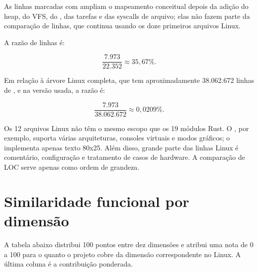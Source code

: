 As linhas marcadas com \code{---} ampliam o mapeamento conceitual depois da
adi\c{c}\~ao do heap, do VFS, do , das tarefas e das syscalls de
arquivo; elas n\~ao fazem parte da compara\c{c}\~ao de linhas, que continua
usando os doze primeiros arquivos Linux.

A raz\~ao de linhas \'e:

\[
\frac{7.973}{22.352} \approx 35{,}67\%.
\]

Em rela\c{c}\~ao \`a \'arvore Linux completa, que tem aproximadamente
38.062.672 linhas de ,  e  na vers\~ao usada, a
raz\~ao \'e:

\[
\frac{7.973}{38.062.672} \approx 0{,}0209\%.
\]

\begin{atencao}
Os 12 arquivos Linux n\~ao t\^em o mesmo escopo que os 19 m\'odulos Rust. O
, por exemplo, suporta v\'arias arquiteturas, consoles
virtuais e modos gr\'aficos; o  implementa apenas texto 80x25.
Al\'em disso, grande parte das linhas Linux \'e coment\'ario, configura\c{c}\~ao
e tratamento de casos de hardware. A compara\c{c}\~ao de LOC serve apenas como
ordem de grandeza.
\end{atencao}

\section{Similaridade funcional por dimens\~ao}

A tabela abaixo distribui 100 pontos entre dez dimens\~oes e atribui uma nota
de 0 a 100 para o quanto o projeto cobre da dimens\~ao correspondente no
Linux. A \'ultima coluna \'e a contribui\c{c}\~ao ponderada.

